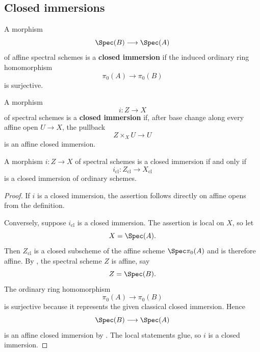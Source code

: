 \subsection{Closed immersions}

\begin{definition}
\label{def:affine-closed-immersion-spectral}
A morphism
\[
    \Spec(B)
    \longrightarrow
    \Spec(A)
\]
of affine spectral schemes is a \textbf{closed immersion} if the induced
ordinary ring homomorphism
\[
    \pi_0(A)
    \longrightarrow
    \pi_0(B)
\]
is surjective.
\end{definition}

\begin{definition}
\label{def:closed-immersion-spectral-schemes}
A morphism
\[
    i
    \colon
    Z
    \longrightarrow
    X
\]
of spectral schemes is a \textbf{closed immersion} if, after base change
along every affine open $U\to X$, the pullback
\[
    Z\times_XU
    \longrightarrow
    U
\]
is an affine closed immersion.
\end{definition}

\begin{proposition}
\label{prop:closed-immersions-classical-detection}
A morphism $i:Z\to X$ of spectral schemes is a closed immersion if and
only if
\[
    i_{\mathrm{cl}}
    \colon
    Z_{\mathrm{cl}}
    \longrightarrow
    X_{\mathrm{cl}}
\]
is a closed immersion of ordinary schemes.
\end{proposition}

\begin{proof}
If $i$ is a closed immersion, the assertion follows directly on affine
opens from the definition.

Conversely, suppose $i_{\mathrm{cl}}$ is a closed immersion. The assertion
is local on $X$, so let
\[
    X=\Spec(A).
\]
Then $Z_{\mathrm{cl}}$ is a closed subscheme of the affine scheme
$\Spec\pi_0(A)$ and is therefore affine. By
, the spectral scheme $Z$ is
affine, say
\[
    Z=\Spec(B).
\]
The ordinary ring homomorphism
\[
    \pi_0(A)
    \longrightarrow
    \pi_0(B)
\]
is surjective because it represents the given classical closed
immersion. Hence
\[
    \Spec(B)
    \longrightarrow
    \Spec(A)
\]
is an affine closed immersion by
. The local statements glue,
so $i$ is a closed immersion.
\end{proof}

